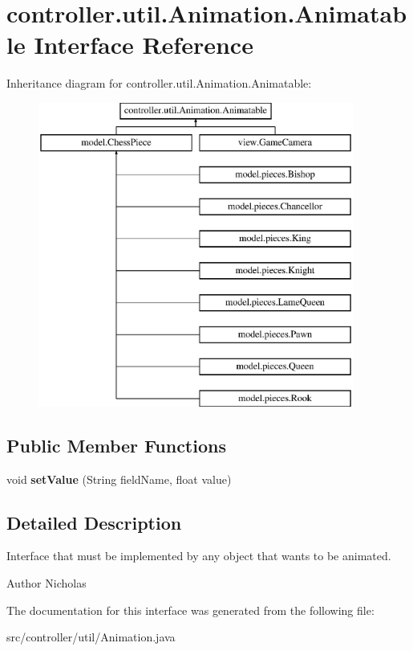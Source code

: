 \hypertarget{interfacecontroller_1_1util_1_1_animation_1_1_animatable}{\section{controller.\-util.\-Animation.\-Animatable Interface Reference}
\label{interfacecontroller_1_1util_1_1_animation_1_1_animatable}
}
Inheritance diagram for controller.\-util.\-Animation.\-Animatable\-:\begin{figure}[H]
\begin{center}
\leavevmode
\includegraphics[height=10.000000cm]{interfacecontroller_1_1util_1_1_animation_1_1_animatable}
\end{center}
\end{figure}
\subsection*{Public Member Functions}
\begin{DoxyCompactItemize}
\item 
\hypertarget{interfacecontroller_1_1util_1_1_animation_1_1_animatable_aa2b27febb195a234f498f23a78a4a952}{void {\bfseries set\-Value} (String field\-Name, float value)}\label{interfacecontroller_1_1util_1_1_animation_1_1_animatable_aa2b27febb195a234f498f23a78a4a952}

\end{DoxyCompactItemize}


\subsection{Detailed Description}
Interface that must be implemented by any object that wants to be animated.

\begin{DoxyAuthor}{Author}
Nicholas 
\end{DoxyAuthor}


The documentation for this interface was generated from the following file\-:\begin{DoxyCompactItemize}
\item 
src/controller/util/Animation.\-java\end{DoxyCompactItemize}
